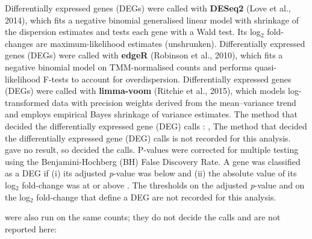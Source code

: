 Differentially expressed genes (DEGs) were called with \textbf{DESeq2} (Love et al., 2014), which fits a negative binomial generalised linear model with shrinkage of the dispersion estimates and tests each gene with a Wald test. Its log$_2$ fold-changes are maximum-likelihood estimates (unshrunken).
Differentially expressed genes (DEGs) were called with \textbf{edgeR} (Robinson et al., 2010), which fits a negative binomial model on TMM-normalised counts and performs quasi-likelihood F-tests to account for overdispersion.
Differentially expressed genes (DEGs) were called with \textbf{limma-voom} (Ritchie et al., 2015), which models log-transformed data with precision weights derived from the mean--variance trend and employs empirical Bayes shrinkage of variance estimates.
The method that decided the differentially expressed gene (DEG) calls :
, 
The method that decided the differentially expressed gene (DEG) calls is not recorded for this analysis.
 gave no result, so  decided the calls.
P-values were corrected for multiple testing using the Benjamini-Hochberg (BH) False Discovery Rate.
A gene was classified as a DEG if (i) its adjusted \textit{p}-value was below  and (ii) the absolute value of its log$_2$ fold-change was at or above .
The thresholds on the adjusted \textit{p}-value and on the log$_2$ fold-change that define a DEG are not recorded for this analysis.

 were also run on the same counts; they do not decide the calls and are not reported here:

